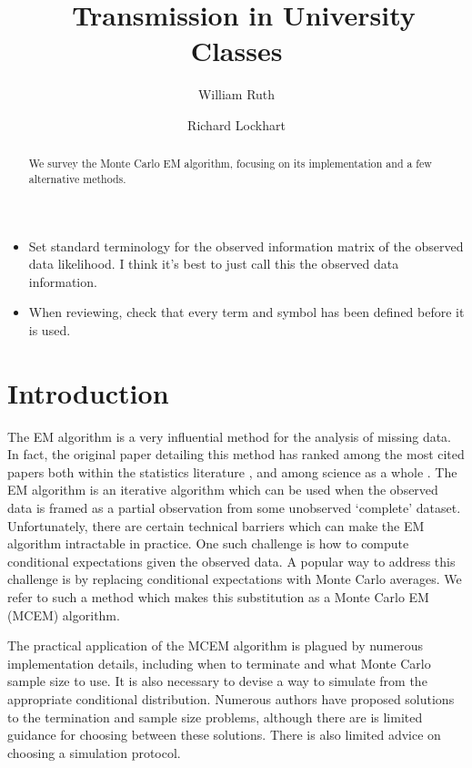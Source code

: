 \documentclass[11pt, oneside]{article}   	%
\title{\SARS\ Transmission in University Classes}
\author[1]{William Ruth}
\author[2]{Richard Lockhart}
\affil[1]{Corresponding Author - Department of Statistics and Actuarial Science \\ Simon Fraser University \\ Burnaby, BC  Canada \\ wruth@sfu.ca}
\affil[2]{Department of Statistics and Actuarial Science \\ Simon Fraser University \\ Burnaby, BC  Canada}
\date{}
\begin{document}


\begin{abstract}
    We survey the Monte Carlo EM algorithm, focusing on its implementation and a few alternative methods.
\end{abstract}

\begin{itemize}
    \color{red}
    \item Set standard terminology for the observed information matrix of the observed data likelihood. I think it's best to just call this the observed data information.
    \item When reviewing, check that every term and symbol has been defined before it is used.
\end{itemize}

\section{Introduction}

The EM algorithm \citep{Dem77} is a very influential method for the analysis of missing data. In fact, the original paper detailing this method has ranked among the most cited papers both within the statistics literature \citep{Rya05}, and among science as a whole \citep{Van14}. The EM algorithm is an iterative algorithm which can be used when the observed data is framed as a partial observation from some unobserved `complete' dataset. Unfortunately, there are certain technical barriers which can make the EM algorithm intractable in practice. One such challenge is how to compute conditional expectations given the observed data. A popular way to address this challenge is by replacing conditional expectations with Monte Carlo averages. We refer to such a method which makes this substitution as a Monte Carlo EM (MCEM) algorithm.

The practical application of the MCEM algorithm is plagued by numerous implementation details, including when to terminate and what Monte Carlo sample size to use. It is also necessary to devise a way to simulate from the appropriate conditional distribution. Numerous authors have proposed solutions to the termination and sample size problems, although there are is limited guidance for choosing between these solutions. There is also limited advice on choosing a simulation protocol. 
\end{document}
